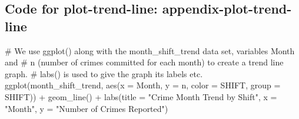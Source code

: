 \documentclass[
]{article}
\newenvironment{Shaded}{}{}
\newcommand{\AttributeTok}[1]{#1}
\newcommand{\CommentTok}[1]{\textcolor[rgb]{0.00,0.50,0.00}{#1}}
\newcommand{\FunctionTok}[1]{#1}
\newcommand{\NormalTok}[1]{#1}
\newcommand{\SpecialCharTok}[1]{\textcolor[rgb]{0.00,0.50,0.50}{#1}}
\newcommand{\StringTok}[1]{\textcolor[rgb]{0.00,0.50,0.50}{#1}}
\begin{document}
\subsection{Code for plot-trend-line:
appendix-plot-trend-line}\label{code-for-plot-trend-line-appendix-plot-trend-line}

\begin{Shaded}
\begin{Highlighting}[]
\CommentTok{\# We use ggplot() along with the month\_shift\_trend data set, variables Month and }
\CommentTok{\# n (number of crimes committed for each month) to create a trend line graph. }
\CommentTok{\# labs() is used to give the graph its labels etc.}
\FunctionTok{ggplot}\NormalTok{(month\_shift\_trend, }
       \FunctionTok{aes}\NormalTok{(}\AttributeTok{x =}\NormalTok{ Month,}
           \AttributeTok{y =}\NormalTok{ n,}
           \AttributeTok{color =}\NormalTok{ SHIFT,}
           \AttributeTok{group =}\NormalTok{ SHIFT)) }\SpecialCharTok{+}
  \FunctionTok{geom\_line}\NormalTok{() }\SpecialCharTok{+} 
  \FunctionTok{labs}\NormalTok{(}\AttributeTok{title =} \StringTok{"Crime Month Trend by Shift"}\NormalTok{,}
       \AttributeTok{x =} \StringTok{"Month"}\NormalTok{,}
       \AttributeTok{y =} \StringTok{"Number of Crimes Reported"}\NormalTok{)}
\end{Highlighting}
\end{Shaded}
\end{document}
